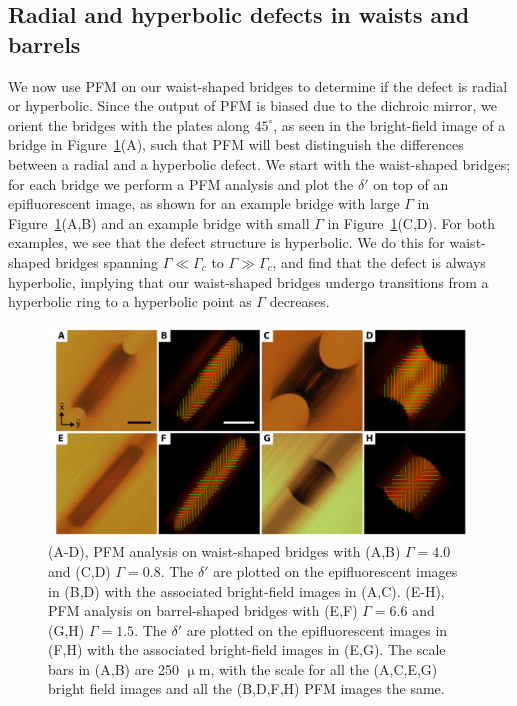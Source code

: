 \subsection{Radial and hyperbolic defects in waists and barrels}
We now use PFM on our waist-shaped bridges to determine if the defect is radial or hyperbolic.
Since the output of PFM is biased due to the dichroic mirror, we orient the bridges with the plates along $45^{\circ}$, as seen in the bright-field image of a bridge in Figure~\ref{f:5-PFM_Bridge}(A), such that PFM will best distinguish the differences between a radial and a hyperbolic defect.
We start with the waist-shaped bridges; for each bridge we perform a PFM analysis and plot the $\delta'$ on top of an epifluorescent image, as shown for an example bridge with large $\Gamma$ in Figure~\ref{f:5-PFM_Bridge}(A,B) and an example bridge with small $\Gamma$ in Figure~\ref{f:5-PFM_Bridge}(C,D).
For both examples, we see that the defect structure is hyperbolic.
We do this for waist-shaped bridges spanning $\Gamma \ll \Gamma_c$ to $\Gamma \gg \Gamma_c$, and find that the defect is always hyperbolic, implying that our waist-shaped bridges undergo transitions from a hyperbolic ring to a hyperbolic point as $\Gamma$ decreases.
\begin{figure}
  \centering
  \includegraphics{figures/C5/Ch5-Figs_PFM_Bridge.png}
  \caption{(A-D), PFM analysis on waist-shaped bridges with (A,B) $\Gamma = 4.0$ and (C,D) $\Gamma = 0.8$.
  The $\delta'$ are plotted on the epifluorescent images in (B,D) with the associated bright-field images in (A,C).
  (E-H), PFM analysis on barrel-shaped bridges with (E,F) $\Gamma = 6.6$ and (G,H) $\Gamma = 1.5$.
 The $\delta'$ are plotted on the epifluorescent images in (F,H) with the associated bright-field images in (E,G).
 The scale bars in (A,B) are 250 $\upmu$m, with the scale for all the (A,C,E,G) bright field images and all the (B,D,F,H) PFM images the same.}\label{f:5-PFM_Bridge}
\end{figure}

